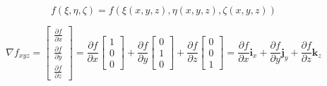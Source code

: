\documentclass
[
a4paper,                      %
twoside,					  %
12pt,                         %
abstract,		      %
fleqn,                        %
]
{scrartcl} %
\begin{document}
\begin{equation}
f\left(\xi,\eta,\zeta\right)=f\left(\xi\left(x,y,z\right),\eta\left(x,y,z\right),\zeta\left(x,y,z\right)\right)
\end{equation}

\begin{equation}
\nabla f_{xyz}=\begin{bmatrix}
\frac{\partial f}{\partial x}\\[5pt]
\frac{\partial f}{\partial y}\\[5pt]
\frac{\partial f}{\partial z}
\end{bmatrix}=\frac{\partial f}{\partial x}\begin{bmatrix}
1\\[5pt]
0\\[5pt]
0
\end{bmatrix}+\frac{\partial f}{\partial y}\begin{bmatrix}
0\\[5pt]
1\\[5pt]
0
\end{bmatrix}+\frac{\partial f}{\partial z}\begin{bmatrix}
0\\[5pt]
0\\[5pt]
1
\end{bmatrix}=\frac{\partial f}{\partial x}\mathbf{i}_{x}+\frac{\partial f}{\partial y}\mathbf{j}_{y}+\frac{\partial f}{\partial z}\mathbf{k}_{z}
\end{equation}
\end{document}
